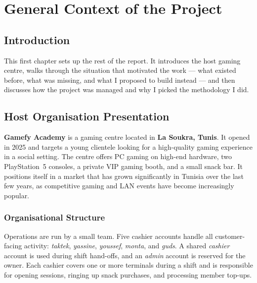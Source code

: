 \documentclass[12pt, a4paper]{report}
\begin{document}
\newpage

\chapter{General Context of the Project}

\section{Introduction}

This first chapter sets up the rest of the report. It introduces the host gaming
centre, walks through the situation that motivated the work — what existed
before, what was missing, and what I proposed to build instead — and then
discusses how the project was managed and why I picked the methodology I did.

\section{Host Organisation Presentation}

\textbf{Gamefy Academy} is a gaming centre located in \textbf{La Soukra, Tunis}.
It opened in 2025 and targets a young clientele looking for a high-quality gaming
experience in a social setting. The centre offers PC gaming on high-end hardware,
two PlayStation~5 consoles, a private VIP gaming booth, and a small snack bar.
It positions itself in a market that has grown significantly in Tunisia over the
last few years, as competitive gaming and LAN events have become increasingly
popular.


\subsection{Organisational Structure}

Operations are run by a small team. Five cashier accounts handle all
customer-facing activity: \textit{taktek}, \textit{yassine}, \textit{youssef},
\textit{monta}, and \textit{guds}. A shared \textit{cashier} account is used during
shift hand-offs, and an \textit{admin} account is reserved for the owner. Each
cashier covers one or more terminals during a shift and is responsible for opening
sessions, ringing up snack purchases, and processing member top-ups.
\end{document}
